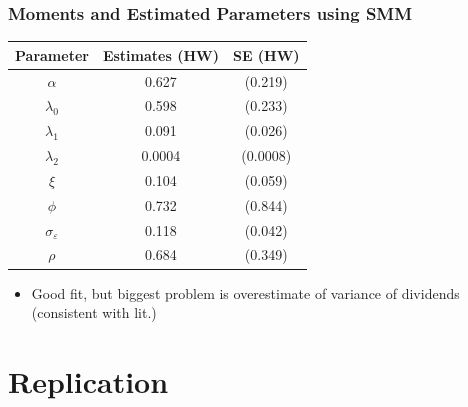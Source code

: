 \documentclass[usenames,dvipsnames, handout]{beamer}
\begin{document}
\begin{frame}
\frametitle{Moments and Estimated Parameters using SMM}
\scriptsize
\begin{center}
\begin{tabular}{ ccc } 
 \hline
 Parameter            & Estimates (HW) & SE (HW) \\ 
 \hline
 $\alpha$             & 0.627 &(0.219) \\ 
 $\lambda_0$          & 0.598 &(0.233) \\ 
 $\lambda_1$          & 0.091 &(0.026) \\ 
 $\lambda_2$          & 0.0004 &(0.0008) \\ 
 $\xi$                & 0.104 &(0.059) \\
 $\phi$               & 0.732 &(0.844) \\
 $\sigma_\varepsilon$ & 0.118 &(0.042) \\
 $\rho$               & 0.684 &(0.349) \\
 \hline 
\end{tabular}
\end{center}

\begin{center}
\end{center}

\begin{itemize}
\item Good fit, but biggest problem is overestimate of variance of dividends (consistent with lit.)
\end{itemize}
\end{frame}

\section{Replication}
\end{document}
